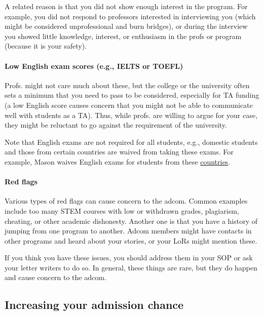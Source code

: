 \documentclass[oneside,11pt,dvipsnames]{book}
\def\subsectioninfo#1{%
    \addcontentsline{toc}{subsectioninfo}{%
    \noexpand\numberline{}\color{black}{#1}}%
}
\begin{document}
A related reason is that you did not show enough interest in the program.
For example, you did not respond to professors interested in interviewing you (which might be considered unprofessional and burn bridges), or during the interview you showed little knowledge, interest, or enthusiasm in the profs or program (because it is your safety). 

\paragraph{Low English exam scores (e.g., IELTS or TOEFL)}  Profs. might not care much about these, but the college or the university often sets a minimum that you need to pass to be considered, especially for TA funding (a low English score causes concern that you might not be able to communicate well with students as a TA).  Thus, while profs. are willing to argue for your case, they might be reluctant to go against the requirement of the university.

Note that English exams are not required for all students, e.g., domestic students and those from certain countries are waived from taking these exams.  For example, Mason waives English exams for students from these \href{https://github.com/dynaroars/dynaroars.github.io/wiki/About-Mason#standard-tests-waiver-eligible-countries}{countries}.


\paragraph{Red flags} Various types of red flags can cause concern to the adcom. Common examples include too many STEM courses with low or withdrawn grades, plagiarism, cheating, or other academic dishonesty. Another one is that you have a history of jumping from one program to another. Adcom members might have contacts in other programs and heard about your stories, or your LoRs might mention these.

If you think you have these issues, you should address them in your SOP or ask your letter writers to do so.
In general, these things are rare, but they do happen and cause concern to the adcom.





\subsection{Increasing your admission chance}\label{sec:improve-your-chance}
\subsectioninfo{You can improve your profile by being unique and standing out.}
\end{document}
